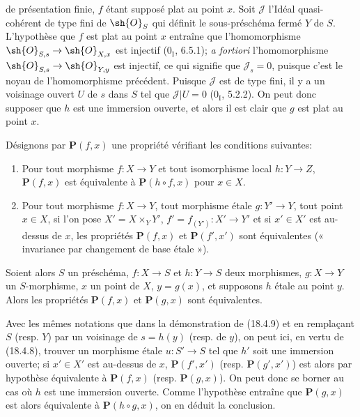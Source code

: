 
de présentation finie, $f$ étant supposé plat au point $x$. Soit $\mathscr J$ l'Idéal quasi-cohérent de type fini de $\sh{O}_S$ qui définit le sous-préschéma fermé $Y$ de $S$. L'hypothèse que $f$ est plat au point $x$ entraîne que l'homomorphisme $\sh{O}_{S,s}\to\sh{O}_{X,x}$ est injectif ($0_{\mathrm I}$, 6.5.1); \emph{a fortiori} l'homomorphisme $\sh{O}_{S,s}\to\sh{O}_{Y,y}$ est injectif, ce qui signifie que $\mathscr J_s=0$, puisque c'est le noyau de l'homomorphisme précédent. Puisque $\mathscr J$ est de type fini, il y a un voisinage ouvert $U$ de $s$ dans $S$ tel que $\mathscr J|U=0$ ($0_{\mathrm I}$, 5.2.2). On peut donc supposer que $h$ est une immersion ouverte, et alors il est clair que $g$ est plat au point $x$.

\begin{proposition}[18.4.10]
\label{IV.18.4.10}
Désignons par $\mathbf P(f,x)$ une propriété vérifiant les conditions suivantes:
\begin{enumerate}
  \item[$1^\circ$] Pour tout morphisme $f:X\to Y$ et tout isomorphisme local $h:Y\to Z$, $\mathbf P(f,x)$ est équivalente à $\mathbf P(h\circ f,x)$ pour $x\in X$.
  \item[$2^\circ$] Pour tout morphisme $f:X\to Y$, tout morphisme étale $g:Y'\to Y$, tout point $x\in X$, si l'on pose $X'=X\times_Y Y'$, $f'=f_{(Y')}:X'\to Y'$ et si $x'\in X'$ est au-dessus de $x$, les propriétés $\mathbf P(f,x)$ et $\mathbf P(f',x')$ sont équivalentes (« invariance par changement de base étale »).
\end{enumerate}
Soient alors $S$ un préschéma, $f:X\to S$ et $h:Y\to S$ deux morphismes, $g:X\to Y$ un $S$-morphisme, $x$ un point de $X$, $y=g(x)$, et supposons $h$ étale au point $y$. Alors les propriétés $\mathbf P(f,x)$ et $\mathbf P(g,x)$ sont équivalentes.
\end{proposition}

Avec les mêmes notations que dans la démonstration de (18.4.9) et en remplaçant $S$ (resp. $Y$) par un voisinage de $s=h(y)$ (resp. de $y$), on peut ici, en vertu de (18.4.8), trouver un morphisme étale $u:S'\to S$ tel que $h'$ soit une immersion ouverte; si $x'\in X'$ est au-dessus de $x$, $\mathbf P(f',x')$ (resp. $\mathbf P(g',x')$) est alors par hypothèse équivalente à $\mathbf P(f,x)$ (resp. $\mathbf P(g,x)$). On peut donc se borner au cas où $h$ est une immersion ouverte. Comme l'hypothèse entraîne que $\mathbf P(g,x)$ est alors équivalente à $\mathbf P(h\circ g,x)$, on en déduit la conclusion.

